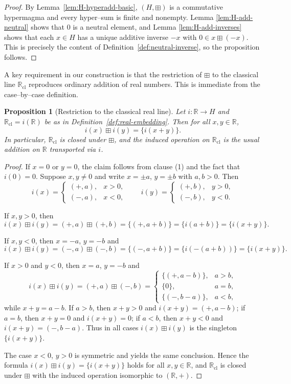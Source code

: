 \documentclass[11pt]{amsart}
\numberwithin{equation}{section}
\newtheorem{proposition}[theorem]{Proposition}
\theoremstyle{definition}
\theoremstyle{remark}
\newcommand{\R}{\mathbb{R}}
\newcommand{\Rc}{\mathbb{R}_{\mathrm{cl}}} %
\newcommand{\Hnum}{H}                      %
\newcommand{\op}{\boxplus}                 %
\newcommand{\iemb}{i}                      %
\begin{document}
\begin{proof}
By Lemma~\ref{lem:H-hyperadd-basic}, $(\Hnum,\op)$ is a commutative
hypermagma and every hyper–sum is finite and nonempty.  Lemma
\ref{lem:H-add-neutral} shows that $0$ is a neutral element, and Lemma
\ref{lem:H-add-inverses} shows that each $x\in\Hnum$ has a unique
additive inverse $-x$ with $0\in x\op(-x)$.  This is precisely the
content of Definition~\ref{def:neutral-inverse}, so the proposition
follows.
\end{proof}

A key requirement in our construction is that the restriction of $\op$
to the classical line $\Rc$ reproduces ordinary addition of real
numbers.  This is immediate from the case–by–case definition.

\begin{proposition}[Restriction to the classical real line]\label{prop:H-add-Rc}
Let $\iemb:\R\to\Hnum$ and $\Rc=\iemb(\R)$ be as in
Definition~\ref{def:real-embedding}.  Then for all $x,y\in\R$,
\[
  \iemb(x)\op\iemb(y)
  = \{\iemb(x+y)\}.
\]
In particular, $\Rc$ is closed under $\op$, and the induced operation
on $\Rc$ is the usual addition on $\R$ transported via $\iemb$.
\end{proposition}

\begin{proof}
If $x=0$ or $y=0$, the claim follows from clause (1) and the fact that
$\iemb(0)=0$.  Suppose $x,y\ne0$ and write $x=\pm a$, $y=\pm b$ with
$a,b>0$.  Then
\[
  \iemb(x) =
  \begin{cases}
    (+,a), & x>0,\\
    (-,a), & x<0,
  \end{cases}
  \qquad
  \iemb(y) =
  \begin{cases}
    (+,b), & y>0,\\
    (-,b), & y<0.
  \end{cases}
\]

If $x,y>0$, then
\[
  \iemb(x)\op\iemb(y)
  = (+,a)\op(+,b)
  = \{(+,a+b)\}
  = \{\iemb(a+b)\}
  = \{\iemb(x+y)\}.
\]

If $x,y<0$, then $x=-a$, $y=-b$ and
\[
  \iemb(x)\op\iemb(y)
  = (-,a)\op(-,b)
  = \{(-,a+b)\}
  = \{\iemb(-(a+b))\}
  = \{\iemb(x+y)\}.
\]

If $x>0$ and $y<0$, then $x=a$, $y=-b$ and
\[
  \iemb(x)\op\iemb(y)
  = (+,a)\op(-,b)
  =
  \begin{cases}
    \{(+,a-b)\}, & a>b,\\[2pt]
    \{0\},       & a=b,\\[2pt]
    \{(-,b-a)\}, & a<b,
  \end{cases}
\]
while $x+y=a-b$.  If $a>b$, then $x+y>0$ and
$\iemb(x+y)=(+,a-b)$; if $a=b$, then $x+y=0$ and $\iemb(x+y)=0$; if
$a<b$, then $x+y<0$ and $\iemb(x+y)=(-,b-a)$.  Thus in all cases
$\iemb(x)\op\iemb(y)$ is the singleton $\{\iemb(x+y)\}$.

The case $x<0$, $y>0$ is symmetric and yields the same conclusion.
Hence the formula $\iemb(x)\op\iemb(y)=\{\iemb(x+y)\}$ holds for all
$x,y\in\R$, and $\Rc$ is closed under $\op$ with the induced operation
isomorphic to $(\R,+)$.
\end{proof}
\end{document}
